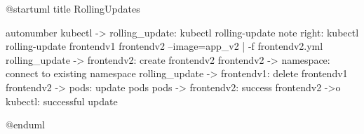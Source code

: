 @startuml
title RollingUpdates

autonumber
kubectl -> rolling_update: kubectl rolling-update
note right: kubectl rolling-update frontendv1 frontendv2 --image=app_v2 | -f frontendv2.yml
rolling_update -> frontendv2: create frontendv2
frontendv2 -> namespace: connect to existing namespace
rolling_update -> frontendv1: delete frontendv1
frontendv2 -> pods: update pods
pods -> frontendv2: success
frontendv2 ->o kubectl: successful update

@enduml
